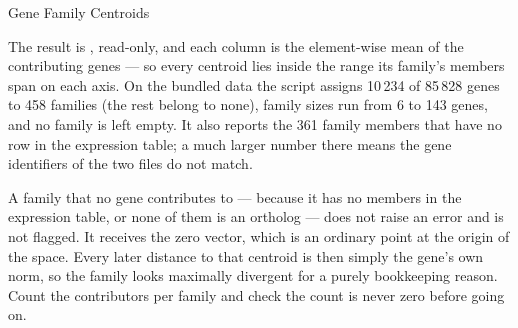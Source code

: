 \begin{recipe}[label=sub:family-centroids]{Gene Family Centroids}
\begin{parameters}
\end{parameters}

\begin{expectedresults}
  The result is , read-only, and each column is
  the element-wise mean of the contributing genes --- so every centroid lies
  inside the range its family's members span on each axis. On the bundled
  data the script assigns 10\,234 of 85\,828 genes to 458 families (the rest
  belong to none), family sizes run from 6 to 143 genes, and no family is left
  empty. It also reports the 361 family members that have no row in the
  expression table; a much larger number there means the gene identifiers of
  the two files do not match.
\end{expectedresults}

\begin{pitfall}
  A family that no gene contributes to --- because it has no members in the
  expression table, or none of them is an ortholog --- does not raise an
  error and is not flagged. It receives the zero vector, which is an ordinary
  point at the origin of the space. Every later distance to that centroid is
  then simply the gene's own norm, so the family looks maximally divergent for
  a purely bookkeeping reason. Count the contributors per family and check
  the count is never zero before going on.
\end{pitfall}


\end{recipe}
